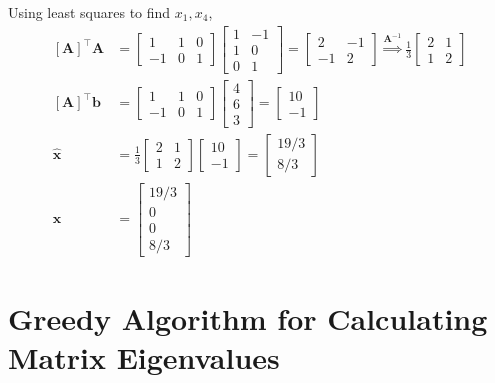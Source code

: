 \documentclass[]{article}
\newcommand{\unit}[1]{\bm{\hat{#1}}}
\newcommand{\tpose}[1]{\left[#1\right]^{\! \top} \!\!}
\begin{document}
Using least squares to find \(x_1, x_4\), 
\begin{align}
	\tpose{\bm{A}} \bm{A} &= \begin{bmatrix}
	1 & 1 & 0 \\
	-1 & 0 & 1
	\end{bmatrix}
	\begin{bmatrix}
	1 & -1 \\
	1 & 0 \\
	0 & 1
	\end{bmatrix} = 
	\begin{bmatrix}
	2 & -1 \\
	-1 & 2
	\end{bmatrix} \overset{\bm{A}^{-1}}{\Rightarrow} 
	\frac{1}{3} \begin{bmatrix}
	2 & 1 \\
	1 & 2
	\end{bmatrix} \\
	\tpose{\bm{A}} \bm{b} &= \begin{bmatrix}
	1 & 1 & 0 \\
	-1 & 0 & 1
	\end{bmatrix}
	\begin{bmatrix}
	4 \\
	6 \\
	3
	\end{bmatrix} = 
	\begin{bmatrix}
	10 \\
	-1
	\end{bmatrix} \\
	\unit{x} &= \frac{1}{3} \begin{bmatrix}
	2 & 1 \\
	1 & 2
	\end{bmatrix}
	\begin{bmatrix}
	10 \\
	-1
	\end{bmatrix} = 
	\begin{bmatrix}
	19 / 3 \\
	8 / 3
	\end{bmatrix} \\
	\bm{x} &= \begin{bmatrix}
	19 / 3 \\
	0 \\
	0 \\
	8 / 3
	\end{bmatrix}
\end{align}

\section{Greedy Algorithm for Calculating Matrix Eigenvalues}
\end{document}
